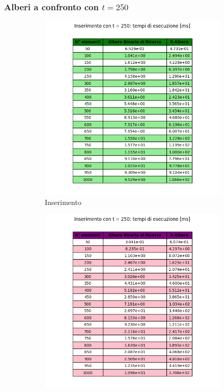 \subsubsection{Alberi a confronto con $t=250$}

\begin{figure}[H]
    \centering
    \begin{subfigure}[b]{0.49\textwidth}
        \centering
        \includegraphics[width=\textwidth]{tables/insert-ms-t250.png}
        \caption{Inserimento}
        \label{fig:tableinserttimet250}
    \end{subfigure}
    \hfill
    \begin{subfigure}[b]{0.49\textwidth}
        \centering
        \includegraphics[width=\textwidth]{tables/search-ms-t250.png}

\end{subfigure}
\end{figure}
